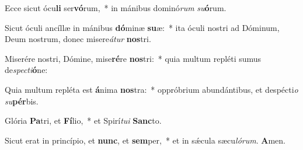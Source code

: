 Ecce sicut ócu\textbf{li} ser\textbf{vó}rum,~* in mánibus dominó\textit{rum} \textit{su}\textbf{ó}rum.

Sicut óculi ancíllæ in mánibus \textbf{dó}minæ \textbf{su}æ:~* ita óculi nostri ad Dóminum, Deum nostrum, donec misere\textit{á}\textit{tur} \textbf{nos}tri.

Miserére nostri, Dómine, mise\textbf{ré}re \textbf{nos}tri:~* quia multum repléti sumus de\textit{spec}\textit{ti}\textbf{ó}ne:

Quia multum repléta est \textbf{á}nima \textbf{nos}tra:~* oppróbrium abundántibus, et despécti\textit{o} \textit{su}\textbf{pér}bis.

Glória \textbf{Pa}tri, et \textbf{Fí}lio,~* et Spirí\textit{tu}\textit{i} \textbf{Sanc}to.

Sicut erat in princípio, et \textbf{nunc}, et \textbf{sem}per,~* et in sǽcula sæcu\textit{ló}\textit{rum}. \textbf{A}men.

